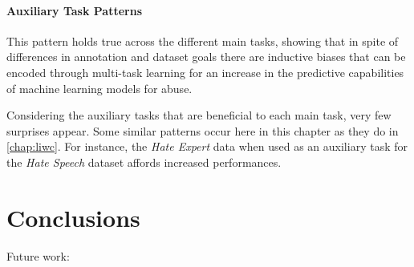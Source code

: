 \paragraph{Auxiliary Task Patterns}

This pattern holds true across the different main tasks, showing that in spite of differences in annotation and dataset goals there are inductive biases that can be encoded through multi-task learning for an increase in the predictive capabilities of machine learning models for abuse.

Considering the auxiliary tasks that are beneficial to each main task, very few surprises appear. Some similar patterns occur here in this chapter as they do in \cref{chap:liwc}.
For instance, the \textit{Hate Expert} data when used as an auxiliary task for the \textit{Hate Speech} dataset affords increased performances.


\section{Conclusions}


Future work:


